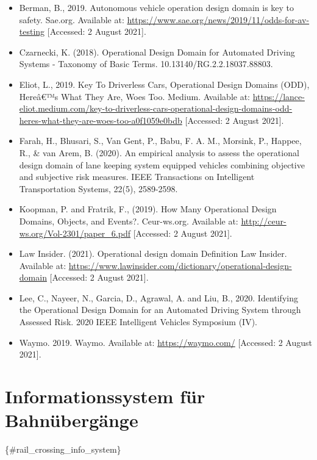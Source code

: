 \documentclass[
]{book}
\providecommand{\tightlist}{%
  \setlength{\itemsep}{0pt}\setlength{\parskip}{0pt}}
\begin{document}
\begin{itemize}
\tightlist
\item
  Berman, B., 2019. Autonomous vehicle operation design domain is key to safety. Sae.org. Available at: \url{https://www.sae.org/news/2019/11/odds-for-av-testing} {[}Accessed: 2 August 2021{]}.
\item
  Czarnecki, K. (2018). Operational Design Domain for Automated Driving Systems - Taxonomy of Basic Terms. 10.13140/RG.2.2.18037.88803.
\item
  Eliot, L., 2019. Key To Driverless Cars, Operational Design Domains (ODD), Hereâ€™s What They Are, Woes Too. Medium. Available at: \url{https://lance-eliot.medium.com/key-to-driverless-cars-operational-design-domains-odd-heres-what-they-are-woes-too-a0f1059e0bdb} {[}Accessed: 2 August 2021{]}.
\item
  Farah, H., Bhusari, S., Van Gent, P., Babu, F. A. M., Morsink, P., Happee, R., \& van Arem, B. (2020). An empirical analysis to assess the operational design domain of lane keeping system equipped vehicles combining objective and subjective risk measures. IEEE Transactions on Intelligent Transportation Systems, 22(5), 2589-2598.
\item
  Koopman, P. and Fratrik, F., (2019). How Many Operational Design Domains, Objects, and Events?. Ceur-ws.org. Available at: \url{http://ceur-ws.org/Vol-2301/paper_6.pdf} {[}Accessed: 2 August 2021{]}.
\item
  Law Insider. (2021). Operational design domain Definition \textbar{} Law Insider. Available at: \url{https://www.lawinsider.com/dictionary/operational-design-domain} {[}Accessed: 2 August 2021{]}.
\item
  Lee, C., Nayeer, N., Garcia, D., Agrawal, A. and Liu, B., 2020. Identifying the Operational Design Domain for an Automated Driving System through Assessed Risk. 2020 IEEE Intelligent Vehicles Symposium (IV).
\item
  Waymo. 2019. Waymo. Available at: \url{https://waymo.com/} {[}Accessed: 2 August 2021{]}.
\end{itemize}

\hypertarget{informationssystem-fuxfcr-bahnuxfcberguxe4nge}{%
\section{Informationssystem für Bahnübergänge}\label{informationssystem-fuxfcr-bahnuxfcberguxe4nge}}

\{\#rail\_crossing\_info\_system\}
\end{document}
